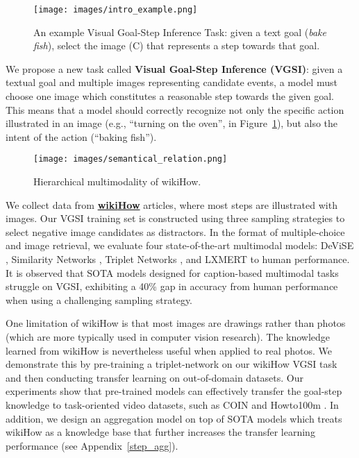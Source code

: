 \documentclass[11pt]{article}
\begin{document}
\begin{figure}[!t]
\centering
    \texttt{[image: images/intro\_example.png]}
    \captionsetup{justification=centering}
    \caption{An example Visual Goal-Step Inference Task: given a text goal ({\it bake fish}), select the image (C) that represents a step towards that goal.}
    \label{fig:example}
\end{figure}

We propose a new task called \textbf{Visual Goal-Step Inference (VGSI)}: given a textual goal and multiple images representing candidate events, a model must choose one image which constitutes a reasonable step towards the given goal. This means that a model should correctly recognize not only the specific action illustrated in an image (e.g., ``turning on the oven'', in Figure~\ref{fig:example}), but also the intent of the action (``baking fish'').

\begin{figure}[!t]
\centering
    \texttt{[image: images/semantical\_relation.png]}
    \caption[semantic relationship]{Hierarchical multimodality of wikiHow.}
    \label{fig:semantical}
    \vspace{-0.15in}
\end{figure}

We collect data from \href{www.wikihow.com}{\textcolor{outerspace}{\textbf{wiki}}\textcolor{OLIVINE}{\textbf{How}}} articles, where most steps are illustrated with images. Our VGSI training set is constructed using three sampling strategies to select negative image candidates as distractors. In the format of multiple-choice and image retrieval, we evaluate four state-of-the-art multimodal models: DeViSE \cite{frome2013devise}, Similarity Networks \cite{wang2018learning}, Triplet Networks  \cite{hoffer2015deep}, and LXMERT \cite{tan2019lxmert} to human performance. It is observed that SOTA models designed for caption-based multimodal tasks \cite{karpathy2014deep, johnson2016densecap} struggle on VGSI, exhibiting a 40\% gap in accuracy from human performance when using a challenging sampling strategy.

One limitation of wikiHow is that most images are drawings rather than photos (which are more typically used in computer vision research). The knowledge learned from wikiHow is nevertheless useful when applied to real photos. We demonstrate this by pre-training a triplet-network on our wikiHow VGSI task and then conducting transfer learning on out-of-domain datasets. Our experiments show that pre-trained models can effectively transfer the goal-step knowledge to task-oriented video datasets, such as COIN \cite{Tang_2019_CVPR} and Howto100m \cite{miech2019howto100m}. In addition, we design an aggregation model on top of SOTA models which treats wikiHow as a knowledge base that further increases the transfer learning performance (see Appendix~\ref{step_agg}).
\end{document}
